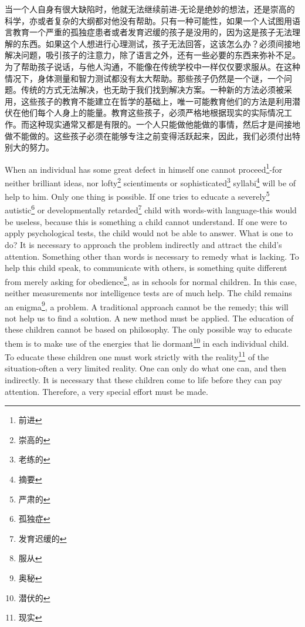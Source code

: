 \documentclass[lang=cn,10pt]{elegantbook}
\begin{document}
当一个人自身有很大缺陷时，他就无法继续前进-无论是绝妙的想法，还是崇高的科学，亦或者复杂的大纲都对他没有帮助。只有一种可能性，如果一个人试图用语言教育一个严重的孤独症患者或者发育迟缓的孩子是没用的，因为这是孩子无法理解的东西。如果这个人想进行心理测试，孩子无法回答，这该怎么办？必须间接地解决问题，吸引孩子的注意力，除了语言之外，还有一些必要的东西来弥补不足。为了帮助孩子说话，与他人沟通，不能像在传统学校中一样仅仅要求服从。在这种情况下，身体测量和智力测试都没有太大帮助。那些孩子仍然是一个谜，一个问题。传统的方式无法解决，也无助于我们找到解决方案。一种新的方法必须被采用，这些孩子的教育不能建立在哲学的基础上，唯一可能教育他们的方法是利用潜伏在他们每个人身上的能量。教育这些孩子，必须严格地根据现实的实际情况工作。而这种现实通常又都是有限的。一个人只能做他能做的事情，然后才是间接地做不能做的。这些孩子必须在能够专注之前变得活跃起来，因此，我们必须付出特别大的努力。

When an individual has some great defect in himself one cannot proceed\footnote{前进}-for neither brilliant ideas, nor lofty\footnote{崇高的} scientiments or sophisticated\footnote{老练的} syllabi\footnote{摘要} will be of help to him. Only one thing is possible. If one tries to educate a severely\footnote{严肃的} autistic\footnote{孤独症} or developmentally retarded\footnote{发育迟缓的} child with words-with language-this would be useless, because this is something a child cannot understand. If one were to apply psychological tests, the child would not be able to answer. What is one to do? It is necessary to approach the problem indirectly and attract the child's attention. Something other than words is necessary to remedy what is lacking. To help this child speak, to communicate with others, is something quite different from merely asking for obedience\footnote{服从}, as in schools for normal children. In this case, neither measurements nor intelligence tests are of much help. The child remains an enigma\footnote{奥秘}, a problem. A traditional approach cannot be the remedy; this will not help us to find a solution. A new method must be applied. The education of these children cannot be based on philosophy. The only possible way to educate them is to make use of the energies that lie dormant\footnote{潜伏的} in each individual child. To educate these children one must work strictly with the reality\footnote{现实} of the situation-often a very limited reality. One can only do what one can, and then indirectly. It is necessary that these children come to life before they can pay attention. Therefore, a very special effort must be made.
\end{document}
